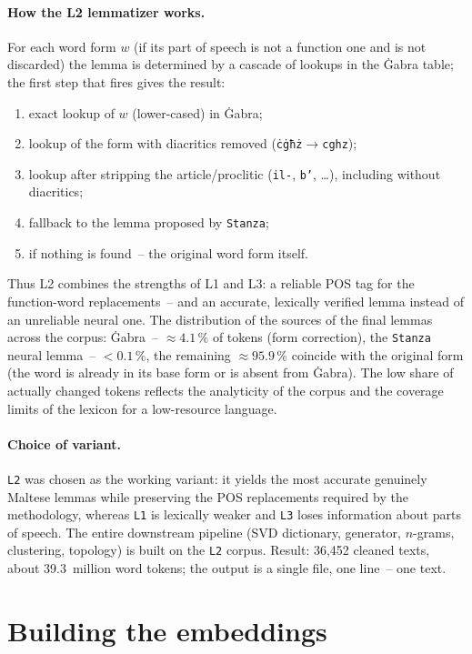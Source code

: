 \documentclass[12pt,a4paper]{article}
\begin{document}
\paragraph{How the L2 lemmatizer works.} For each word form $w$ (if its part of
speech is not a function one and is not discarded) the lemma is determined by a
cascade of lookups in the Ġabra table; the first step that fires gives the
result:
\begin{enumerate}[nosep]
  \item exact lookup of $w$ (lower-cased) in Ġabra;
  \item lookup of the form with diacritics removed
        (\texttt{ċġħż}$\to$\texttt{cghz});
  \item lookup after stripping the article/proclitic
        (\texttt{il-}, \texttt{b'}, \ldots), including without diacritics;
  \item fallback to the lemma proposed by \texttt{Stanza};
  \item if nothing is found~-- the original word form itself.
\end{enumerate}
Thus L2 combines the strengths of L1 and L3: a reliable POS tag for the
function-word replacements~-- and an accurate, lexically verified lemma instead
of an unreliable neural one. The distribution of the sources of the final lemmas
across the corpus: Ġabra~-- $\approx4.1\,\%$ of tokens (form correction),
the \texttt{Stanza} neural lemma~-- $<0.1\,\%$, the remaining $\approx95.9\,\%$
coincide with the original form (the word is already in its base form or is
absent from Ġabra). The low share of actually changed tokens reflects the
analyticity of the corpus and the coverage limits of the lexicon for a
low-resource language.

\paragraph{Choice of variant.} \texttt{L2} was chosen as the working variant: it
yields the most accurate genuinely Maltese lemmas while preserving the POS
replacements required by the methodology, whereas \texttt{L1} is lexically
weaker and \texttt{L3} loses information about parts of speech. The entire
downstream pipeline (SVD dictionary, generator, $n$-grams, clustering, topology)
is built on the \texttt{L2} corpus. Result: 36{,}452 cleaned texts, about
39.3~million word tokens; the output is a single file, one line~-- one text.

\section{Building the embeddings}
\end{document}
